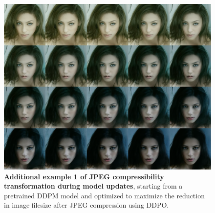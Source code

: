 \begin{appendixs}
        \begin{figure}
            \centering
            \includegraphics[scale=1.40]{img/results/compressibility_40.png}
            \vspace{-0pt}  %
            \captionsetup{width=\textwidth} %
            \caption{\textbf{Additional example 1 of JPEG compressibility transformation during model updates}, starting from a pretrained DDPM model and optimized to maximize the reduction in image filesize after JPEG compression using DDPO.}
            \label{fig:ddpm-to-ddpo-compressibility-extra1}
        \end{figure}


\end{appendixs}

